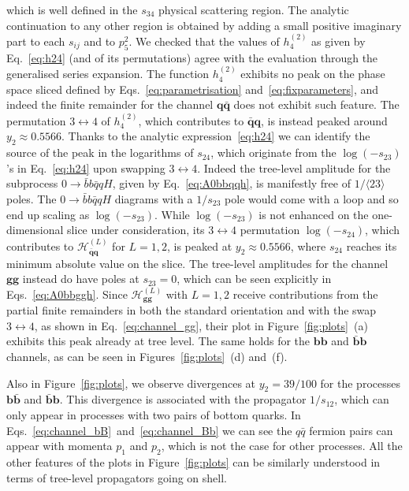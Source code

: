 \documentclass[main.tex]{subfiles}
\begin{document}
which is well defined in the $s_{34}$ physical scattering region. The analytic continuation to any other region is obtained by adding a small positive imaginary part to each $s_{ij}$ and to $p_5^2$. We checked that the values of $h^{(2)}_4$ as given by Eq.~\ref{eq:h24} (and of its permutations) agree with the evaluation through the generalised series expansion. The function $h^{(2)}_4$ exhibits no peak on the phase space sliced defined by Eqs.~\ref{eq:parametrisation} and~\ref{eq:fixparameters}, and indeed the finite remainder for the channel $\mathbf{q\bar{q}}$ does not exhibit such feature. The permutation $3\leftrightarrow 4$ of $h^{(2)}_4$, which contributes to $\mathbf{\bar{q}q}$, is instead peaked around $y_2 \approx 0.5566$. Thanks to the analytic expression~\ref{eq:h24} we can identify the source of the peak in the logarithms of $s_{24}$, which originate from the $\log (-s_{23})$'s in Eq.~\ref{eq:h24} upon swapping $3\leftrightarrow 4$. Indeed the tree-level amplitude for the subprocess $0\to\bar{b} b \bar{q} q H$, given by Eq.~\ref{eq:A0bbqqh}, is manifestly free of $1/\langle 23 \rangle$ poles. The $0\to\bar{b} b \bar{q} q H$ diagrams with a $1/s_{23}$ pole would come with a loop and so end up scaling as $\log(-s_{23})$. While $\log(-s_{23})$ is not enhanced on the one-dimensional slice under consideration, its $3\leftrightarrow4$ permutation $\log(-s_{24})$, which contributes to $\mathcal{H}^{(L)}_{\mathbf{\bar{q}q}}$ for $L=1,2$, is peaked at $y_2 \approx 0.5566$, where $s_{24}$ reaches its minimum absolute value on the slice. 
The tree-level amplitudes for the channel $\mathbf{gg}$ instead do have poles at $s_{23}=0$, which
can be seen explicitly in Eqs.~\ref{eq:A0bbggh}. Since $\mathcal{H}^{(L)}_{\mathbf{gg}}$ with
$L=1,2$ receive contributions from the partial finite remainders in both the standard orientation
and with the swap $3\leftrightarrow4$, as shown in Eq.~\ref{eq:channel_gg}, their plot in Figure~\ref{fig:plots}~(a) exhibits this peak already at tree level. The same holds for the $\mathbf{bb}$ and $\mathbf{\bar{b}b}$ channels, as can be seen in Figures~\ref{fig:plots}~(d) and~(f). 

Also in Figure~\ref{fig:plots}, we observe divergences at $y_2 = 39/100$ for the processes
$\mathbf{b\bar{b}}$ and $\mathbf{\bar{b}b}$. This divergence is associated with the propagator
$1/s_{12}$, which can only appear in processes with two pairs of bottom quarks. In Eqs.~\ref{eq:channel_bB}~and~\ref{eq:channel_Bb} 
we can see the $q\bar{q}$ fermion pairs can appear
with momenta $p_1$ and $p_2$, which is not the case for other processes. All the other features of the plots
in Figure~\ref{fig:plots} can be similarly understood in terms of tree-level propagators going on shell.
\end{document}
